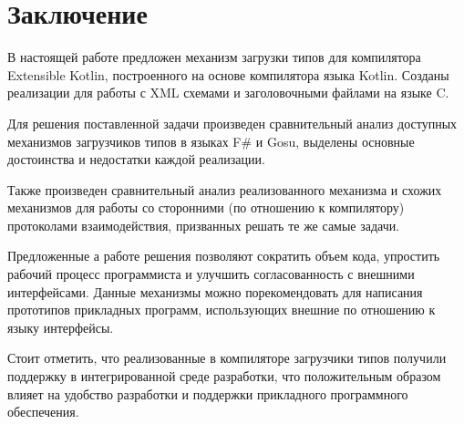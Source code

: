 \clearpage
\section{Заключение}
В настоящей работе предложен механизм загрузки типов для компилятора Extensible Kotlin, построенного на основе компилятора языка Kotlin.
Созданы реализации для работы с XML схемами и заголовочными файлами на языке C.

Для решения поставленной задачи произведен сравнительный анализ доступных механизмов загрузчиков типов в языках
F\# и Gosu, выделены основные достоинства и недостатки каждой реализации.

Также произведен сравнительный анализ реализованного механизма и схожих механизмов для работы со сторонними
(по отношению к компилятору) протоколами взаимодействия, призванных решать те же самые задачи.

Предложенные а работе решения позволяют сократить объем кода, упростить рабочий процесс программиста и улучшить согласованность с внешними интерфейсами. Данные механизмы можно порекомендовать для написания прототипов прикладных программ, использующих внешние по отношению к языку интерфейсы.

Стоит отметить, что реализованные в компиляторе загрузчики типов получили поддержку в интегрированной среде разработки, что положительным образом влияет на удобство разработки и поддержки прикладного программного обеспечения.

\clearpage
